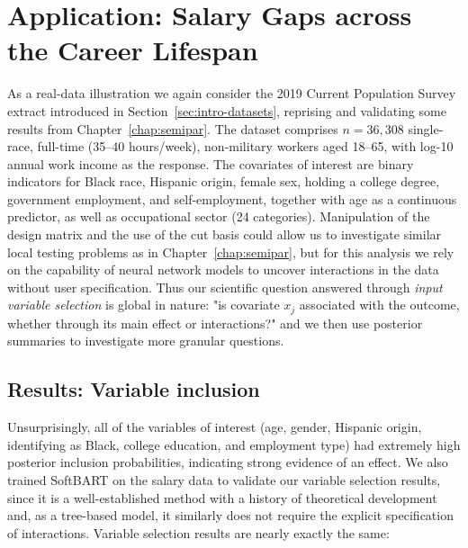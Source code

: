 {\section{Application: Salary Gaps across the Career Lifespan}
\label{subsec:ch3-salary}
As a real-data illustration we again consider the 2019 Current Population
Survey extract introduced in Section~\ref{sec:intro-datasets}, reprising and validating 
some results from Chapter~\ref{chap:semipar}.  The
dataset comprises $n = 36{,}308$ single-race, full-time (35--40
hours/week), non-military workers aged 18--65, with log-10 annual work
income as the response. The covariates of interest are binary
indicators for Black race, Hispanic origin, female sex, holding a
college degree, government employment, and self-employment, together
with age as a continuous predictor, as well as occupational sector (24
categories).  Manipulation of the design matrix and the use of the cut basis could allow us to investigate similar local testing problems as in Chapter~\ref{chap:semipar}, but for this analysis we rely on the capability of neural network models to uncover interactions in the data without user specification.  Thus our scientific question answered through \emph{input variable selection} is global in nature: "is covariate $x_j$ associated with the outcome, whether through its main effect or interactions?" and we then use posterior summaries to investigate more granular questions.


\subsection{Results: Variable inclusion}
Unsurprisingly, all of the variables of interest (age, gender, Hispanic origin, identifying as Black, college education, and employment type) had extremely high posterior inclusion probabilities, indicating strong evidence of an effect.  We also trained SoftBART on the salary data to validate our variable selection results, since it is a well-established method with a history of theoretical development and, as a tree-based model, it similarly does not require the explicit specification of interactions.  Variable selection results are nearly exactly the same:

}
